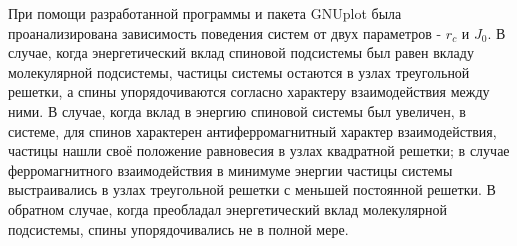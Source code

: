 \documentclass[14pt,a4paper,report]{ncc}
\begin{document}
При помощи разработанной программы и пакета GNUplot была проанализирована зависимость поведения систем от двух параметров - $r_c$ и $J_0$. В случае, когда энергетический вклад спиновой подсистемы был равен вкладу молекулярной подсистемы, частицы системы остаются в узлах треугольной решетки, а спины упорядочиваются согласно характеру взаимодействия между ними. В случае, когда вклад в энергию спиновой системы был увеличен, в системе, для спинов характерен антиферромагнитный характер взаимодействия, частицы нашли своё положение равновесия в узлах квадратной решетки; в случае ферромагнитного взаимодействия в минимуме энергии частицы системы выстраивались в узлах треугольной решетки с меньшей постоянной решетки.
В обратном случае, когда преобладал энергетический вклад молекулярной подсистемы, спины упорядочивались не в полной мере.
\
\end{document}

